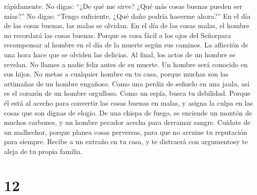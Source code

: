 rápidamente.  No digas: ``¿De qué me sirve? ¿Qué más
cosas buenas pueden ser mías?''  No digas: ``Tengo
suficiente. ¿Qué daño podría hacerme ahora?''  En el día
de las cosas buenas, las malas se olvidan. En el día de las cosas malas,
el hombre no recordará las cosas buenas.  Porque es cosa
fácil a los ojos del Señorpara recompensar al hombre en el día de la
muerte según sus caminos.  La aflicción de una hora hace
que se olviden las delicias. Al final, los actos de un hombre se
revelan.  No llames a nadie feliz antes de su muerte. Un
hombre será conocido en sus hijos.  No metas a cualquier
hombre en tu casa, porque muchas son las artimañas de un hombre
engañoso.  Como una perdiz de señuelo en una jaula, así
es el corazón de un hombre orgulloso. Como un espía, busca tu debilidad.
 Porque él está al acecho para convertir las cosas buenas
en malas, y asigna la culpa en las cosas que son dignas de elogio.
 De una chispa de fuego, se enciende un montón de muchos
carbones, y un hombre pecador acecha para derramar sangre.
 Cuídate de un malhechor, porque planea cosas perversas,
para que no arruine tu reputación para siempre.  Recibe a
un extraño en tu casa, y te distraerá con argumentosy te aleja de tu
propia familia.

\hypertarget{section-11}{%
\section{12}\label{section-11}}

